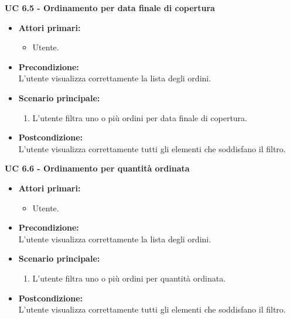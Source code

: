 \vspace{0.5cm}

\noindent \textbf{\large UC 6.5 - Ordinamento per data finale di copertura}
\label{uc:ordinamento-data-finale-copertura}
\begin{itemize}

	\item \textbf{Attori primari: }
		\begin{itemize}
			\item Utente.
		\end{itemize}

	\item \textbf{Precondizione: }\\[0.3cm]
		L'utente visualizza correttamente la lista degli ordini.

	\item \textbf{Scenario principale: }
		\begin{enumerate}
			\item L'utente filtra uno o più ordini per data finale di copertura.
		\end{enumerate}
		

	\item \textbf{Postcondizione: }\\[0.3cm]
		L'utente visualizza correttamente tutti gli elementi che soddisfano il filtro.

\end{itemize}

\vspace{0.5cm}

\noindent \textbf{\large UC 6.6 - Ordinamento per quantità ordinata}
\label{uc:ordinamento-quantità-ordinata}
\begin{itemize}

	\item \textbf{Attori primari: }
		\begin{itemize}
			\item Utente.
		\end{itemize}

	\item \textbf{Precondizione: }\\[0.3cm]
		L'utente visualizza correttamente la lista degli ordini.

	\item \textbf{Scenario principale: }
		\begin{enumerate}
			\item L'utente filtra uno o più ordini per quantità ordinata.
		\end{enumerate}
		

	\item \textbf{Postcondizione: }\\[0.3cm]
		L'utente visualizza correttamente tutti gli elementi che soddisfano il filtro.

\end{itemize}


